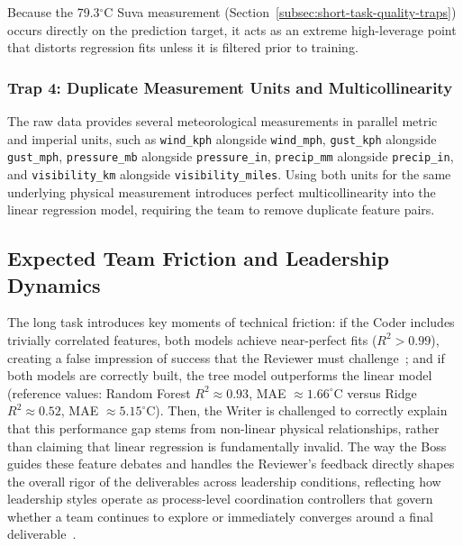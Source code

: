 Because the 79.3$^\circ$C Suva measurement (Section~\ref{subsec:short-task-quality-traps}) occurs directly on the prediction target, it acts as an extreme high-leverage point that distorts regression fits unless it is filtered prior to training.

\subsubsection{Trap 4: Duplicate Measurement Units and Multicollinearity}
\label{subsubsec:trap-duplicate-units}

The raw data provides several meteorological measurements in parallel metric and imperial units, such as \texttt{wind\_kph} alongside \texttt{wind\_mph}, \texttt{gust\_kph} alongside \texttt{gust\_mph}, \texttt{pressure\_mb} alongside \texttt{pressure\_in}, \texttt{precip\_mm} alongside \texttt{precip\_in}, and \texttt{visibility\_km} alongside \texttt{visibility\_miles}.
Using both units for the same underlying physical measurement introduces perfect multicollinearity into the linear regression model, requiring the team to remove duplicate feature pairs.

\subsection{Expected Team Friction and Leadership Dynamics}
\label{subsec:long-task-friction}

The long task introduces key moments of technical friction:
if the Coder includes trivially correlated features, both models achieve near-perfect fits ($R^2 > 0.99$), creating a false impression of success that the Reviewer must challenge~\cite{guo2024embodiedllmagentslearn};
and if both models are correctly built, the tree model outperforms the linear model (reference values: Random Forest $R^2 \approx 0.93$, MAE $\approx 1.66^\circ$C versus Ridge $R^2 \approx 0.52$, MAE $\approx 5.15^\circ$C).
Then, the Writer is challenged to correctly explain that this performance gap stems from non-linear physical relationships, rather than claiming that linear regression is fundamentally invalid.
The way the Boss guides these feature debates and handles the Reviewer's feedback directly shapes the overall rigor of the deliverables across leadership conditions, reflecting how leadership styles operate as process-level coordination controllers that govern whether a team continues to explore or immediately converges around a final deliverable~\cite{kwak2026leadershipcoordinationcontrolbehavioral, muralidharan2025lessonshumanteamsapplied}.


